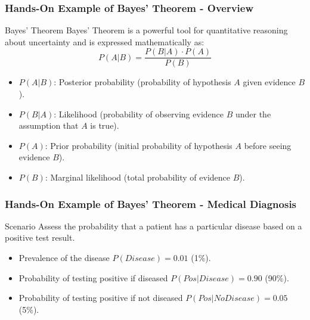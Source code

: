 \documentclass[aspectratio=169]{beamer}
\begin{document}
\begin{frame}[fragile]
    \frametitle{Hands-On Example of Bayes' Theorem - Overview}
    \begin{block}{Bayes' Theorem}
        Bayes' Theorem is a powerful tool for quantitative reasoning about uncertainty and is expressed mathematically as:
        \[
        P(A|B) = \frac{P(B|A) \cdot P(A)}{P(B)}
        \]
    \end{block}
    \begin{itemize}
        \item \( P(A|B) \): Posterior probability (probability of hypothesis \( A \) given evidence \( B \)).
        \item \( P(B|A) \): Likelihood (probability of observing evidence \( B \) under the assumption that \( A \) is true).
        \item \( P(A) \): Prior probability (initial probability of hypothesis \( A \) before seeing evidence \( B \)).
        \item \( P(B) \): Marginal likelihood (total probability of evidence \( B \)).
    \end{itemize}
\end{frame}

\begin{frame}[fragile]
    \frametitle{Hands-On Example of Bayes' Theorem - Medical Diagnosis}
    \begin{block}{Scenario}
        Assess the probability that a patient has a particular disease based on a positive test result.
    \end{block}
    \begin{itemize}
        \item Prevalence of the disease \( P(Disease) = 0.01 \) (1\%).
        \item Probability of testing positive if diseased \( P(Pos|Disease) = 0.90 \) (90\%).
        \item Probability of testing positive if not diseased \( P(Pos|No Disease) = 0.05 \) (5\%).
    \end{itemize}
\end{frame}
\end{document}

